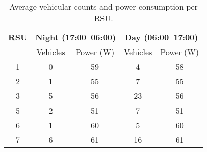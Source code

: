 \begin{table}[htbp]
    \centering
    \caption{Average vehicular counts and power consumption per RSU.}
    \label{tab:rsu-traffic-power}
    \begin{tabular}{|c|cc|cc|}
        \hline
        \textbf{RSU} & \multicolumn{2}{c|}{\textbf{Night (17:00--06:00)}} & \multicolumn{2}{c|}{\textbf{Day (06:00--17:00)}}                        \\
        \cline{2-5}
                     & Vehicles                                           & Power (W)                                        & Vehicles & Power (W) \\
        \hline
        1            & 0                                                  & 59                                               & 4        & 58        \\
        2            & 1                                                  & 55                                               & 7        & 55        \\
        3            & 5                                                  & 56                                               & 23       & 56        \\
        5            & 2                                                  & 51                                               & 7        & 51        \\
        6            & 1                                                  & 60                                               & 5        & 60        \\
        7            & 6                                                  & 61                                               & 16       & 61        \\
        \hline
    \end{tabular}
\end{table}